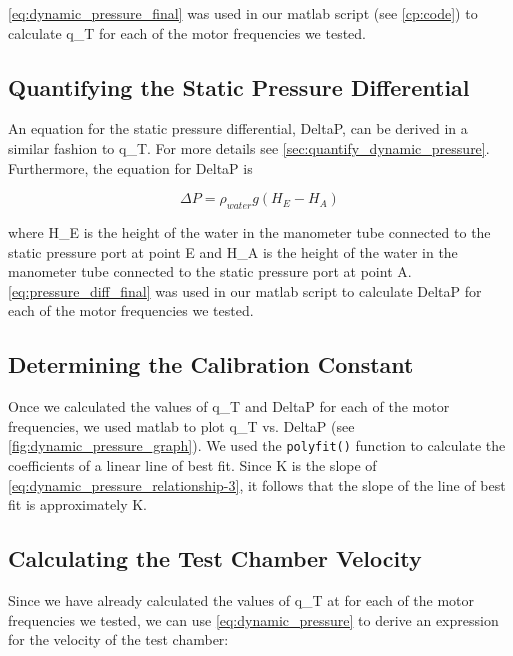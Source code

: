 \noindent{}\autoref{eq:dynamic_pressure_final} was used in our \acrfull{matlab} script (see \autoref{cp:code}) to calculate \gls{q_T} for each of the motor frequencies we tested.

\subsection{Quantifying the Static Pressure Differential}

An equation for the static pressure differential, \gls{DeltaP}, can be derived in a similar fashion to \gls{q_T}. For more details see \autoref{sec:quantify_dynamic_pressure}. Furthermore, the equation for \gls{DeltaP} is

\begin{equation}\label{eq:pressure_diff_final}
    \Delta{}P = \rho_{water}g\left(H_E - H_A\right)
\end{equation}

\noindent{}where \gls{H_E} is the height of the water in the manometer tube connected to the static pressure port at point E and \gls{H_A} is the height of the water in the manometer tube connected to the static pressure port at point A. \autoref{eq:pressure_diff_final} was used in our \acrshort{matlab} script to calculate \gls{DeltaP} for each of the motor frequencies we tested.

\subsection{Determining the Calibration Constant}\label{sec:determine_calibration_constant}

Once we calculated the values of \gls{q_T} and \gls{DeltaP} for each of the motor frequencies, we used \acrshort{matlab} to plot \gls{q_T} vs. \gls{DeltaP} (see \autoref{fig:dynamic_pressure_graph}). We used the \verb|polyfit()| function to calculate the coefficients of a linear line of best fit. Since \gls{K} is the slope of \autoref{eq:dynamic_pressure_relationship-3}, it follows that the slope of the line of best fit is approximately \gls{K}.

\subsection{Calculating the Test Chamber Velocity}\label{sec:calc_velocity}

Since we have already calculated the values of \gls{q_T} at for each of the motor frequencies we tested, we can use \autoref{eq:dynamic_pressure} to derive an expression for the velocity of the test chamber:

